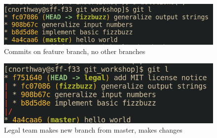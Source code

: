 \documentclass{beamer} \usetheme{Madrid}
\begin{document}
\begin{frame}
    \begin{figure}
        \includegraphics[height=\textwidth-2cm]{ex_imgs/3.png}
        \caption{Commits on feature branch, no other branches}
    \end{figure}
\end{frame}
\begin{frame}
    \begin{figure}
        \includegraphics[height=\textwidth-2cm]{ex_imgs/4.png}
        \caption{Legal team makes new branch from master, makes changes}
    \end{figure}
\end{frame}
\end{document}

